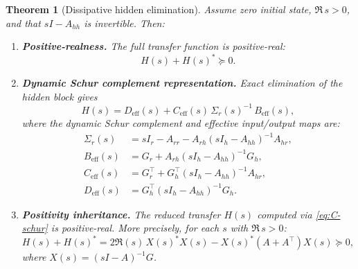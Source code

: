 \documentclass[11pt,a4paper]{article}
\numberwithin{equation}{section}
\theoremstyle{thmcompact}
\newtheorem{theorem}{Theorem}[section]
\theoremstyle{remark}
\begin{document}
\begin{theorem}[Dissipative hidden elimination]\label{thm:bridge-C}
Assume zero initial state, $\Re\, s > 0$, and that $sI - A_{hh}$ is invertible. Then:
\begin{enumerate}[label=\textup{(\roman*)}]
\item \textbf{Positive-realness.} The full transfer function is positive-real:
\begin{equation}\label{eq:C-pr}
H(s) + H(s)^* \succeq 0.
\end{equation}

\item \textbf{Dynamic Schur complement representation.} Exact elimination of the hidden block gives
\begin{equation}\label{eq:C-schur}
H(s) = D_{\mathrm{eff}}(s) + C_{\mathrm{eff}}(s)\,\Sigma_r(s)^{-1}\,B_{\mathrm{eff}}(s),
\end{equation}
where the dynamic Schur complement and effective input/output maps are:
\begin{align}
\Sigma_r(s) &= sI_r - A_{rr} - A_{rh}(sI_h - A_{hh})^{-1}A_{hr}, \label{eq:C-sigma} \\
B_{\mathrm{eff}}(s) &= G_r + A_{rh}(sI_h - A_{hh})^{-1}G_h, \label{eq:C-beff} \\
C_{\mathrm{eff}}(s) &= G_r^\top + G_h^\top(sI_h - A_{hh})^{-1}A_{hr}, \label{eq:C-ceff} \\
D_{\mathrm{eff}}(s) &= G_h^\top(sI_h - A_{hh})^{-1}G_h. \label{eq:C-deff}
\end{align}

\item \textbf{Positivity inheritance.} The reduced transfer $H(s)$ computed via \eqref{eq:C-schur} is positive-real. More precisely, for each $s$ with $\Re\,s > 0$:
\begin{equation}\label{eq:C-pr-reduced}
H(s) + H(s)^* = 2\Re(s)\,X(s)^* X(s) - X(s)^*(A + A^\top)X(s) \succeq 0,
\end{equation}
where $X(s) = (sI - A)^{-1}G$.


\end{enumerate}
\end{theorem}
\end{document}
